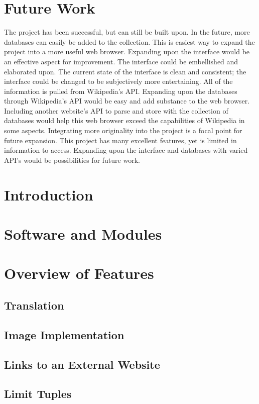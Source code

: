 \documentclass{sig-alternate-05-2015}
\begin{document}
\section{Future Work}
The project has been successful, but can still be built upon. In the future, more databases can easily be added to the collection. This is easiest way to expand the project into a more useful web browser. Expanding upon the interface would be an effective aspect for improvement. The interface could be embellished and elaborated upon. The current state of the interface is clean and consistent; the interface could be changed to be subjectively more entertaining. All of the information is pulled from Wikipedia's API. Expanding upon the databases through Wikipedia's API would be easy and add substance to the web browser. Including another website's API to parse and store with the collection of databases would help this web browser exceed the capabilities of Wikipedia in some aspects. Integrating more originality into the project is a focal point for future expansion. This project has many excellent features, yet is limited in information to access. Expanding upon the interface and databases with varied API's would be possibilities for future work. 





\appendix
\section{Introduction}
\section{Software and Modules}
\section{Overview of Features}
\subsection{Translation}
\subsection{Image Implementation}
\subsection{Links to an External Website}
\subsection{Limit Tuples}
\end{document}
